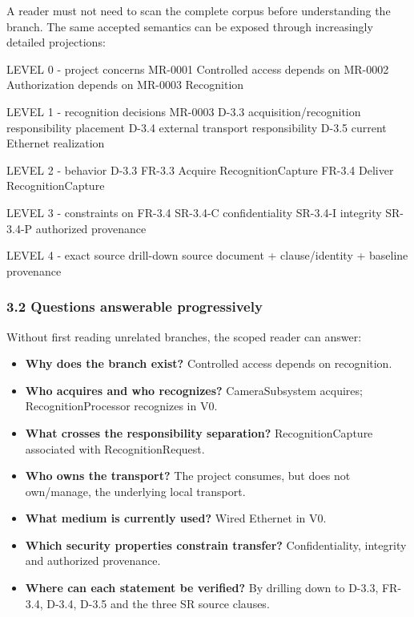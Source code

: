 \documentclass[
  10pt,
  a4paper,
]{article}
\newenvironment{Shaded}{}{}
\newcommand{\NormalTok}[1]{#1}
\providecommand{\tightlist}{%
  \setlength{\itemsep}{0pt}\setlength{\parskip}{0pt}}
\begin{document}
A reader must not need to scan the complete corpus before understanding
the branch. The same accepted semantics can be exposed through
increasingly detailed projections:

\begin{Shaded}
\begin{Highlighting}[]
\NormalTok{LEVEL 0 {-} project concerns}
\NormalTok{MR{-}0001 Controlled access}
\NormalTok{    depends on MR{-}0002 Authorization}
\NormalTok{    depends on MR{-}0003 Recognition}

\NormalTok{LEVEL 1 {-} recognition decisions}
\NormalTok{MR{-}0003}
\NormalTok{    D{-}3.3 acquisition/recognition responsibility placement}
\NormalTok{    D{-}3.4 external transport responsibility}
\NormalTok{    D{-}3.5 current Ethernet realization}

\NormalTok{LEVEL 2 {-} behavior}
\NormalTok{D{-}3.3}
\NormalTok{    FR{-}3.3 Acquire RecognitionCapture}
\NormalTok{    FR{-}3.4 Deliver RecognitionCapture}

\NormalTok{LEVEL 3 {-} constraints on FR{-}3.4}
\NormalTok{    SR{-}3.4{-}C confidentiality}
\NormalTok{    SR{-}3.4{-}I integrity}
\NormalTok{    SR{-}3.4{-}P authorized provenance}

\NormalTok{LEVEL 4 {-} exact source drill{-}down}
\NormalTok{    source document + clause/identity + baseline provenance}
\end{Highlighting}
\end{Shaded}

\subsubsection{3.2 Questions answerable
progressively}\label{32-questions-answerable-progressively}

Without first reading unrelated branches, the scoped reader can answer:

\begin{itemize}
\tightlist
\item
  \textbf{Why does the branch exist?} Controlled access depends on
  recognition.
\item
  \textbf{Who acquires and who recognizes?} CameraSubsystem acquires;
  RecognitionProcessor recognizes in V0.
\item
  \textbf{What crosses the responsibility separation?}
  RecognitionCapture associated with RecognitionRequest.
\item
  \textbf{Who owns the transport?} The project consumes, but does not
  own/manage, the underlying local transport.
\item
  \textbf{What medium is currently used?} Wired Ethernet in V0.
\item
  \textbf{Which security properties constrain transfer?}
  Confidentiality, integrity and authorized provenance.
\item
  \textbf{Where can each statement be verified?} By drilling down to
  D-3.3, FR-3.4, D-3.4, D-3.5 and the three SR source clauses.
\end{itemize}
\end{document}

